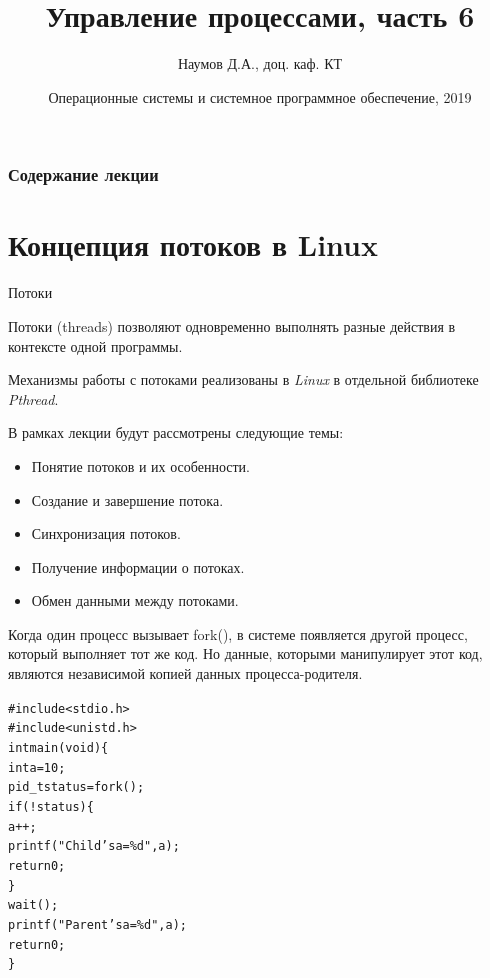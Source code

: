 \documentclass{beamer}
\title[Язык C]{Управление процессами, часть 6}
\author{Наумов Д.А., доц. каф. КТ}
\date[15.10.2019] {Операционные системы и системное программное обеспечение, 2019}
\begin{document}
\begin{frame}
  \titlepage
\end{frame}
  
\begin{frame}
  \frametitle{Содержание лекции}
  \tableofcontents  
\end{frame}

\section{Концепция потоков в Linux}

\begin{frame}{Потоки}
\begin{block}{Потоки (threads)}
позволяют одновременно выполнять разные действия в контексте одной программы. 
\end{block}
Механизмы работы с потоками реализованы в \textit{Linux} в отдельной библиотеке \textit{Pthread}.

В рамках лекции будут рассмотрены следующие темы:
\begin{itemize}
\item Понятие потоков и их особенности.
\item Создание и завершение потока.
\item Синхронизация потоков.
\item Получение информации о потоках.
\item Обмен данными между потоками.
\end{itemize}
\end{frame}

\begin{frame}[fragile]
Когда один процесс вызывает fork(), в системе появляется другой процесс, который выполняет тот же код. Но данные, которыми манипулирует этот код, являются независимой копией данных процесса-родителя. 
\begin{alltt}
#include <stdio.h>
#include <unistd.h>
int main (void)\{
  int a = 10;
  pid\_t status = fork ();
  if (!status) \{
    a++; 
    printf ("Child's a=\%d", a);
    return 0;
  \}
  wait ();
  printf ("Parent's a=\%d", a);
  return 0;
\}
\end{alltt}
\end{frame}
\end{document}
